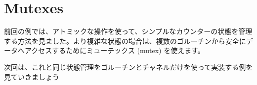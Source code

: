 \section{Mutexes}

前回の例では、アトミックな操作を使って、シンプルなカウンターの状態を管理する方法を見ました。より複雑な状態の場合は、複数のゴルーチンから安全にデータへアクセスするためにミューテックス (mutex) を使えます。




次回は、これと同じ状態管理をゴルーチンとチャネルだけを使って実装する例を見ていきましょう